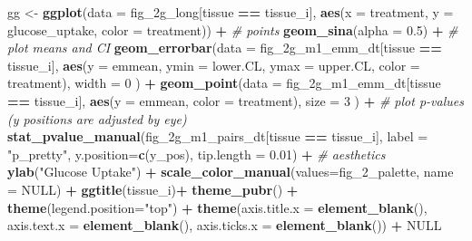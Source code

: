 \documentclass[]{book}
\newenvironment{Shaded}{\begin{snugshade}}{\end{snugshade}}
\newcommand{\CommentTok}[1]{\textcolor[rgb]{0.56,0.35,0.01}{\textit{#1}}}
\newcommand{\DataTypeTok}[1]{\textcolor[rgb]{0.13,0.29,0.53}{#1}}
\newcommand{\DecValTok}[1]{\textcolor[rgb]{0.00,0.00,0.81}{#1}}
\newcommand{\FloatTok}[1]{\textcolor[rgb]{0.00,0.00,0.81}{#1}}
\newcommand{\KeywordTok}[1]{\textcolor[rgb]{0.13,0.29,0.53}{\textbf{#1}}}
\newcommand{\NormalTok}[1]{#1}
\newcommand{\OperatorTok}[1]{\textcolor[rgb]{0.81,0.36,0.00}{\textbf{#1}}}
\newcommand{\OtherTok}[1]{\textcolor[rgb]{0.56,0.35,0.01}{#1}}
\newcommand{\StringTok}[1]{\textcolor[rgb]{0.31,0.60,0.02}{#1}}
\begin{document}
\begin{Shaded}
\begin{Highlighting}[]
\NormalTok{  gg <-}\StringTok{ }\KeywordTok{ggplot}\NormalTok{(}\DataTypeTok{data =}\NormalTok{ fig_2g_long[tissue }\OperatorTok{==}\StringTok{ }\NormalTok{tissue_i],}
                      \KeywordTok{aes}\NormalTok{(}\DataTypeTok{x =}\NormalTok{ treatment,}
                          \DataTypeTok{y =}\NormalTok{ glucose_uptake,}
                          \DataTypeTok{color =}\NormalTok{ treatment)) }\OperatorTok{+}
\StringTok{    }
\StringTok{    }\CommentTok{# points}
\StringTok{    }\KeywordTok{geom_sina}\NormalTok{(}\DataTypeTok{alpha =} \FloatTok{0.5}\NormalTok{) }\OperatorTok{+}
\StringTok{    }
\StringTok{    }\CommentTok{# plot means and CI}
\StringTok{    }\KeywordTok{geom_errorbar}\NormalTok{(}\DataTypeTok{data =}\NormalTok{ fig_2g_m1_emm_dt[tissue }\OperatorTok{==}\StringTok{ }\NormalTok{tissue_i],}
                  \KeywordTok{aes}\NormalTok{(}\DataTypeTok{y =}\NormalTok{ emmean,}
                      \DataTypeTok{ymin =}\NormalTok{ lower.CL,}
                      \DataTypeTok{ymax =}\NormalTok{ upper.CL,}
                      \DataTypeTok{color =}\NormalTok{ treatment),}
                  \DataTypeTok{width =} \DecValTok{0}
\NormalTok{    ) }\OperatorTok{+}
\StringTok{    }
\StringTok{    }\KeywordTok{geom_point}\NormalTok{(}\DataTypeTok{data =}\NormalTok{ fig_2g_m1_emm_dt[tissue }\OperatorTok{==}\StringTok{ }\NormalTok{tissue_i],}
               \KeywordTok{aes}\NormalTok{(}\DataTypeTok{y =}\NormalTok{ emmean,}
                   \DataTypeTok{color =}\NormalTok{ treatment),}
               \DataTypeTok{size =} \DecValTok{3}
\NormalTok{    ) }\OperatorTok{+}
\StringTok{    }
\StringTok{    }\CommentTok{# plot p-values (y positions are adjusted by eye)}
\StringTok{    }\KeywordTok{stat_pvalue_manual}\NormalTok{(fig_2g_m1_pairs_dt[tissue }\OperatorTok{==}\StringTok{ }\NormalTok{tissue_i],}
                       \DataTypeTok{label =} \StringTok{"p_pretty"}\NormalTok{,}
                       \DataTypeTok{y.position=}\KeywordTok{c}\NormalTok{(y_pos),}
                       \DataTypeTok{tip.length =} \FloatTok{0.01}\NormalTok{) }\OperatorTok{+}
\StringTok{    }
\StringTok{    }\CommentTok{# aesthetics}
\StringTok{    }\KeywordTok{ylab}\NormalTok{(}\StringTok{"Glucose Uptake"}\NormalTok{) }\OperatorTok{+}
\StringTok{    }\KeywordTok{scale_color_manual}\NormalTok{(}\DataTypeTok{values=}\NormalTok{fig_}\DecValTok{2}\NormalTok{_palette,}
                       \DataTypeTok{name =} \OtherTok{NULL}\NormalTok{) }\OperatorTok{+}
\StringTok{    }\KeywordTok{ggtitle}\NormalTok{(tissue_i)}\OperatorTok{+}
\StringTok{    }
\StringTok{    }\KeywordTok{theme_pubr}\NormalTok{() }\OperatorTok{+}
\StringTok{    }\KeywordTok{theme}\NormalTok{(}\DataTypeTok{legend.position=}\StringTok{"top"}\NormalTok{) }\OperatorTok{+}
\StringTok{    }\KeywordTok{theme}\NormalTok{(}\DataTypeTok{axis.title.x =} \KeywordTok{element_blank}\NormalTok{(),}
          \DataTypeTok{axis.text.x =} \KeywordTok{element_blank}\NormalTok{(),}
          \DataTypeTok{axis.ticks.x =} \KeywordTok{element_blank}\NormalTok{()) }\OperatorTok{+}
\StringTok{    }
\StringTok{    }\OtherTok{NULL}
  

\end{Highlighting}
\end{Shaded}
\end{document}
